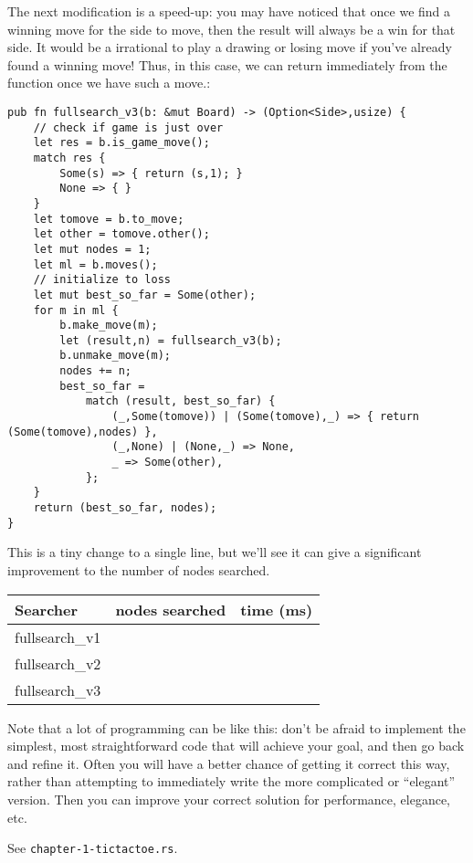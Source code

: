 \documentclass[10pt,dvipdfmx]{report}
\begin{document}
The next modification is a speed-up: you may have noticed that once we find a winning move for the side
to move, then the result will always be a win for that side. It would be a irrational to play a drawing or losing move
if you've already found a winning move!  Thus, in this case, we can return immediately from the function once we have such a
move.:
{\small
\begin{verbatim}
pub fn fullsearch_v3(b: &mut Board) -> (Option<Side>,usize) {
    // check if game is just over
    let res = b.is_game_move();
    match res {
        Some(s) => { return (s,1); }
        None => { }
    }
    let tomove = b.to_move;
    let other = tomove.other();
    let mut nodes = 1;
    let ml = b.moves();
    // initialize to loss
    let mut best_so_far = Some(other);
    for m in ml {
        b.make_move(m);
        let (result,n) = fullsearch_v3(b);
        b.unmake_move(m);
        nodes += n;
        best_so_far =
            match (result, best_so_far) {
                (_,Some(tomove)) | (Some(tomove),_) => { return (Some(tomove),nodes) },
                (_,None) | (None,_) => None,
                _ => Some(other),
            };
    }
    return (best_so_far, nodes);
}
\end{verbatim}
}
This is a tiny change to a single line, but we'll see it can give a significant improvement to
the number of nodes searched.

\begin{center}
\begin{tabular}{l|rr}
    Searcher       & nodes searched & time (ms) \\\hline
    fullsearch\_v1 &                &           \\
    fullsearch\_v2 &                &           \\
    fullsearch\_v3 &                &           \\
\end{tabular}
\end{center}

Note that a lot of programming can be like this: don't be afraid to implement
the simplest, most straightforward code that will achieve your goal, and then
go back and refine it.  Often you will have a better chance of getting it correct
this way, rather than attempting to immediately write the more complicated or
``elegant'' version.  Then you can improve your correct solution for performance,
elegance, etc.

See {\tt chapter-1-tictactoe.rs}.
\end{document}
